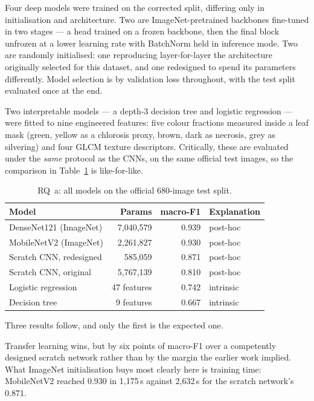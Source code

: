 \documentclass[sigconf,nonacm]{acmart}
\begin{document}
Four deep models were trained on the corrected split, differing only in
initialisation and architecture. Two are ImageNet-pretrained backbones fine-tuned
in two stages --- a head trained on a frozen backbone, then the final block
unfrozen at a lower learning rate with BatchNorm held in inference mode. Two are
randomly initialised: one reproducing layer-for-layer the architecture originally
selected for this dataset, and one redesigned to spend its parameters
differently. Model selection is by validation loss throughout, with the test
split evaluated once at the end.

Two interpretable models --- a depth-3 decision tree and logistic regression ---
were fitted to nine engineered features: five colour fractions measured inside a
leaf mask (green, yellow as a chlorosis proxy, brown, dark as necrosis, grey as
silvering) and four GLCM texture descriptors. Critically, these are evaluated
under the \emph{same} protocol as the CNNs, on the same official test images, so
the comparison in Table~\ref{tab:rqa} is like-for-like.

\begin{table}[t]
\caption{RQ~a: all models on the official 680-image test split.}
\label{tab:rqa}
\begin{tabular}{lrrl}
\toprule
Model & Params & macro-F1 & Explanation \\
\midrule
DenseNet121 (ImageNet)   & 7{,}040{,}579 & 0.939 & post-hoc \\
MobileNetV2 (ImageNet)   & 2{,}261{,}827 & 0.930 & post-hoc \\
Scratch CNN, redesigned  &   585{,}059 & 0.871 & post-hoc \\
Scratch CNN, original    & 5{,}767{,}139 & 0.810 & post-hoc \\
Logistic regression      &  47 features & 0.742 & intrinsic \\
Decision tree            &   9 features & 0.667 & intrinsic \\
\bottomrule
\end{tabular}
\end{table}

Three results follow, and only the first is the expected one.

Transfer learning wins, but by six points of macro-F1 over a competently designed
scratch network rather than by the margin the earlier work implied. What ImageNet
initialisation buys most clearly here is training time: MobileNetV2 reached 0.930
in 1{,}175\,s against 2{,}632\,s for the scratch network's 0.871.
\end{document}
